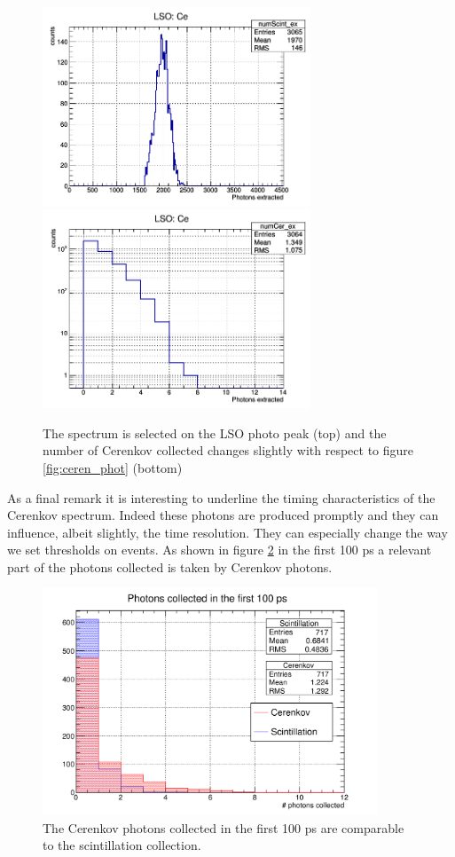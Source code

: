 \begin{figure}[htbp]
\begin{center}
\includegraphics[width=8cm]{../Pictures/Chapter_5/pp_LSO.png}
\includegraphics[width=8cm]{../Pictures/Chapter_5/cer_extr_LSO.png}
\end{center}
\caption[Photopeak selection for Cerenkov simulation]{The spectrum is selected on the LSO photo peak (top) and the number of Cerenkov collected changes slightly with respect to figure \ref{fig:ceren_phot} (bottom)}
\label{fig:ceren_pp}
\end{figure}
\newpage
As a final remark it is interesting to underline the timing characteristics of the Cerenkov spectrum. Indeed these photons are produced promptly and they can influence, albeit slightly, the time resolution. They can especially change the way we set thresholds on events.
As shown in figure \ref{fig:time_ratio} in the first 100 ps a relevant part of the photons collected is taken by Cerenkov photons.
\begin{figure}[htbp]
\begin{center}
\includegraphics[width=10cm]{../Pictures/Chapter_5/cer_second_balance.png}
\end{center}
\caption[Scintillation/Cerenkov ratio in the first 100 ps]{The Cerenkov photons collected in the first 100 ps are comparable to the scintillation collection.}
\label{fig:time_ratio}
\end{figure}

